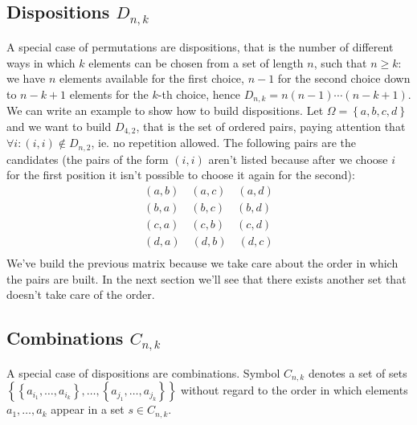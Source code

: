 \subsection{Dispositions $D_{n,k}$}

A special case of permutations are dispositions, that is the number of
different ways in which $k$ elements can be chosen from a set of
length $n$, such that $n \geq k$: we have $n$ elements available for the
first choice, $n-1$ for the second choice down to $n-k+1$ elements
for the $k$-th choice, hence $D_{n,k} = n(n-1)\cdots(n-k+1)$.  We can
write an example to show how to build dispositions. Let $\Omega =
\left \lbrace a,b,c, d\right\rbrace $ and we want to build $D_{4,2}$,
that is the set of ordered pairs, paying attention that $ \forall i:
(i,i)\not \in D_{n,2}$, ie. no repetition allowed.
The following pairs are the candidates (the
pairs of the form $(i,i)$ aren't listed because after we choose $i$
for the first position it isn't possible to choose it again for the
second):
\begin{displaymath}
  \begin{split}
    \left ( a, b \right)\quad
    \left ( a, c \right)\quad
    \left ( a, d \right)\\
    \left ( b, a \right)\quad
    \left ( b, c \right)\quad
    \left ( b, d \right)\\
    \left ( c, a \right)\quad
    \left ( c, b \right)\quad
    \left ( c, d \right)\\
    \left ( d, a \right)\quad
    \left ( d, b \right)\quad
    \left ( d, c \right)\\
  \end{split}
\end{displaymath}
We've build the previous matrix because we take care about
the order in which the pairs are built. In the next section we'll see
that there exists another set that doesn't take care of the order.

\subsection{Combinations $C_{n,k}$}

A special case of dispositions are combinations. Symbol $C_{n,k}$ denotes
a set of sets $\left \lbrace \left \lbrace
    a_{i_1}, \ldots, a_{i_k} \right\rbrace , \ldots,  \left \lbrace
    a_{j_1}, \ldots, a_{j_k} \right\rbrace\right\rbrace$ without
regard to the order in which elements $a_{1}, \ldots, a_{k}$ appear in
a set $s \in C_{n,k}$.

